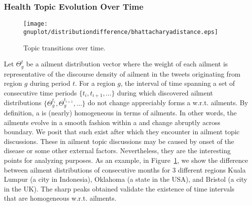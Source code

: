 \subsubsection{Health Topic Evolution Over Time}
\begin{figure}[b!]
\centering
\texttt{[image: gnuplot/distributiondifference/bhattacharyadistance.eps]}
\caption{Topic transitions over time.}
\label{fig:ailmentsEvolve}
\end{figure}
Let $\Theta_g^t$ be a ailment distribution vector where the weight of each ailment is representative of the discourse density of ailment in the tweets originating from region $g$ during period $t$.
For a region $g$, the interval of time spanning a set of consecutive time periods $\{t_i,t_{i+1},\ldots\}$ during which discovered ailment distributions  $\{\Theta_g^{t_i},\Theta_g^{t_{i+1}},\ldots\}$
do not change appreciably forms a \season w.r.t. ailments. By definition, a \season is (nearly) homogeneous in terms
of ailments. In other words, the ailments evolve in a smooth fashion
within a \season and change abruptly across \season boundary. We posit that such \seasons exist after which they encounter \changes in ailment topic discussions. These \changes in ailment topic discussions 
may be caused by onset of the disease or some other external factors. Nevertheless, they are the interesting points for analyzing purposes.
As an example, in Figure~\ref{fig:ailmentsEvolve}, we show the difference between ailment distributions of consecutive months for 3 different regions Kuala Lumpur (a city in Indonesia), Oklahoma (a state in the USA), and Bristol (a city in the UK). The sharp peaks obtained validate the existence of time intervals that are homogeneous w.r.t. ailments.
